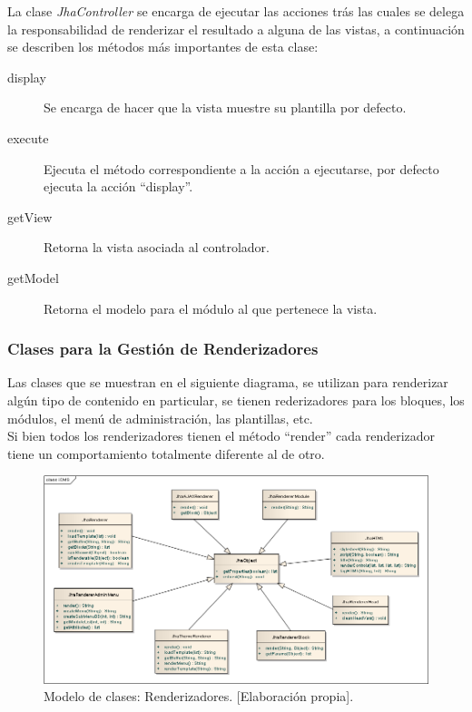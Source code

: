 

La clase \emph{JhaController} se encarga de ejecutar las acciones tr\'as las cuales se delega la responsabilidad de renderizar el resultado a alguna de las vistas, a continuaci\'on se describen los m\'etodos m\'as importantes de esta clase:
\begin{description}
\item[display] Se encarga de hacer que la vista muestre su plantilla por defecto.
\item[execute] Ejecuta el m\'etodo correspondiente a la acci\'on a ejecutarse, por defecto ejecuta la acci\'on ``display''.
\item[getView] Retorna la vista asociada al controlador.
\item[getModel] Retorna el modelo para el m\'odulo al que pertenece la vista.
\end{description}



\newpage
\subsubsection{Clases para la Gesti\'on de Renderizadores}
Las clases que se muestran en el siguiente diagrama, se utilizan para renderizar alg\'un tipo de contenido en particular, se tienen rederizadores para los bloques, los m\'odulos, el men\'u de administraci\'on, las plantillas, etc.\\
Si bien todos los renderizadores tienen el m\'etodo ``render'' cada renderizador tiene un comportamiento totalmente diferente al de otro.

\begin{figure}[h]
\centering
\includegraphics[scale=.45, keepaspectratio=true]{imagenes/10_imagen.png}
\caption{Modelo de clases: Renderizadores. [Elaboraci\'on propia].}
\end{figure}


